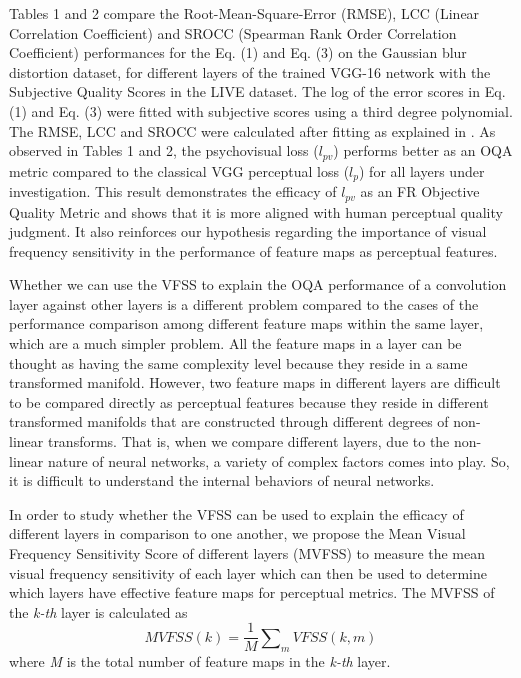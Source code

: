 \documentclass[10pt,twocolumn,letterpaper]{article}
\begin{document}
Tables 1 and 2 compare the Root-Mean-Square-Error (RMSE),  LCC (Linear Correlation Coefficient) and SROCC (Spearman Rank Order Correlation Coefficient) performances for the Eq. (1) and Eq. (3) on the Gaussian blur distortion dataset, for different layers of the trained VGG-16 network with the Subjective Quality Scores in the LIVE dataset. The log of the error scores in Eq. (1) and Eq. (3) were fitted with subjective scores using a third degree polynomial. The RMSE, LCC and SROCC were calculated after fitting as explained in \cite{4}. As observed in Tables 1 and 2, the psychovisual loss ($l_{pv}$) performs better as an OQA metric compared to the classical VGG perceptual loss ($l_{p}$) for all layers under investigation. This result demonstrates the efficacy of $l_{pv}$ as an FR Objective Quality Metric and shows that it is more aligned with human perceptual quality judgment. It also reinforces our hypothesis regarding the importance of visual frequency sensitivity in the performance of feature maps as perceptual features.

Whether we can use the VFSS to explain the OQA performance of a convolution layer against other layers is a different problem compared to the cases of the performance comparison among different feature maps within the same layer, which are a much simpler problem. All the feature maps in a layer can be thought as having the same complexity level because they reside in a same transformed manifold. However, two feature maps in different layers are difficult to be compared directly as perceptual features because they reside in different transformed manifolds that are constructed through different degrees of non-linear transforms. That is, when we compare different layers, due to the non-linear nature of neural networks, a variety of complex factors comes into play. So, it is difficult to understand the internal behaviors of neural networks.  
   
In order to study whether the VFSS can be used to explain the efficacy of different layers in comparison to one another, we propose the Mean Visual Frequency Sensitivity Score of different layers (MVFSS) to measure the mean visual frequency sensitivity of each layer which can then be used to determine which layers have effective feature maps for perceptual metrics. The MVFSS of the \textit{k-th} layer is calculated as
\begin{equation}
   MVFSS(k)=\frac{1}{M}\sum\nolimits_{m}VFSS(k,m)
\end{equation}
where \textit{M} is the total number of feature maps in the \textit{k-th} layer. 
\end{document}
